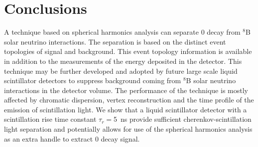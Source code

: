 \section{Conclusions}
A technique based on spherical harmonics analysis can
separate 0{\nbb} decay from $^{8}$B solar neutrino interactions. The
separation is based on the distinct event topologies of signal and
background. This event topology information is available in addition
to the measurements of the energy deposited in the detector. This
technique may be further developed and adopted by future large scale
liquid scintillator detectors to suppress background coming from
$^{8}$B solar neutrino interactions in the detector volume. The
performance of the technique is mostly affected by chromatic
dispersion, vertex reconstruction and the time profile of the emission of scintillation light. We show that a liquid scintillator detector
with a scintillation rise time constant $\tau_r=$5~ns provide sufficient cherenkov-scintillation light separation and potentially allows
for use of the spherical harmonics analysis
as an extra handle to extract 0{\nbb} decay signal.

